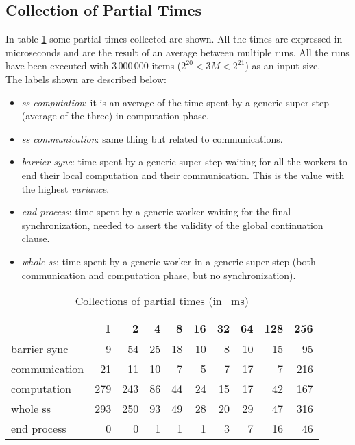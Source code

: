 \documentclass[]{article}
\begin{document}
\subsection{Collection of Partial Times}
\label{sec:tseq}
In table \ref{tab:tseq} some partial times collected are shown. All the times are expressed in microseconds and are the result of an average between multiple runs. All the runs have been executed with $3\,000\,000$ items ($2^{20} < 3M < 2^{21}$) as an input size.\\ 
The labels shown are described below:
\begin{itemize}
	\item \emph{ss computation}: it is an average of the time spent by a generic super step (average of the three) in computation phase.
	\item \emph{ss communication}: same thing but related to communications.
	\item \emph{barrier sync}: time spent by a generic super step waiting for all the workers to end their local computation and their communication. This is the value with the highest \emph{variance}.
	\item \emph{end process}: time spent by a generic worker waiting for the final synchronization, needed to assert the validity of the global continuation clause.
	\item \emph{whole ss}: time spent by a generic worker in a generic super step (both communication and computation phase, but no synchronization).
\end{itemize}
\begin{table}[H]
	\centering
	\begin{tabular}{l|*{9}r}
		\toprule
		\diagbox{phase}{$\mathit{nw}$} 
		& 1 & 2 & 4 & 8 & 16 & 32 & 64 & 128 & 256 \\
		\midrule
		barrier sync & 9 & 54 & 25 & 18 & 10 & 8 & 10 & 15 & 95 \\
		communication & 21 & 11 & 10 & 7 & 5 & 7 & 17 & 7 & 216 \\
		computation & 279 & 243 & 86 & 44 & 24 & 15 & 17 & 42 & 167 \\
		whole ss & 293 & 250 & 93 & 49 & 28 & 20 & 29 & 47 & 316 \\
		end process & 0 & 0 & 1 & 1 & 1 & 3 & 7 & 16 & 46 \\
		\bottomrule
	\end{tabular}%
	\caption{Collections of partial times (in \SI{}{\milli \second})}
	\label{tab:tseq}%
\end{table}%
\end{document}
